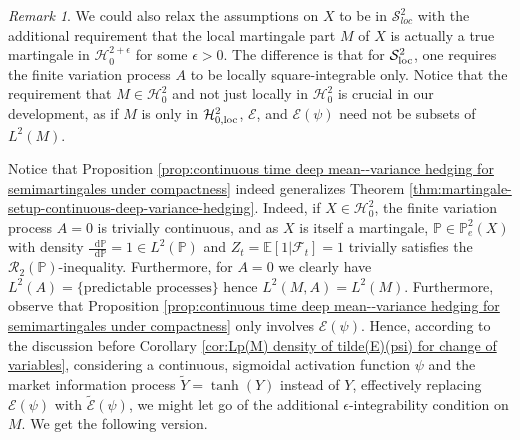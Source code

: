 \documentclass[11pt,a4paper,twoside,openany]{report}
\numberwithin{equation}{section}
\newcommand{\diff}{\mathop{}\!\mathrm{d}}
\theoremstyle{plain} %
\theoremstyle{definition} %
\theoremstyle{remark} %
\newtheorem{remark}[theorem]{Remark}
\begin{document}
\begin{remark}\label{rem:relaxed assumptions}
    We could also relax the assumptions on \(X\) to be in \(\mathcal{S}^2_{loc}\) with the additional requirement that the local martingale part \(M\) of \(X\) is actually a true martingale in \(\mathcal{H}_0^{2+\epsilon}\) for some \(\epsilon>0\). The difference is that for \(\mathcal{S}_{\rm{loc}}^2\), one requires the finite variation process \(A\) to be locally square-integrable only. Notice that the requirement that \(M\in\mathcal{H}^2_0\) and not just locally in \(\mathcal{H}^2_0\) is crucial in our development, as if \(M\) is only in  \(\mathcal{H}^2_{0,\rm{loc}}\), \(\mathcal{E}\), and \(\mathcal{E}(\psi)\) need not be subsets of \(L^2(M)\).
\end{remark}
Notice that Proposition \ref{prop:continuous time deep mean--variance hedging for semimartingales under compactness} indeed generalizes Theorem \ref{thm:martingale-setup-continuous-deep-variance-hedging}. Indeed, if \(X\in\mathcal{H}^2_0\), the finite variation process \(A=0\) is trivially continuous, and as \(X\) is itself a martingale, \(\mathbb{P}\in \mathbb{P}_e^2(X)\) with density \(\frac{\diff \mathbb{P}}{\diff \mathbb{P}}=1\in L^2(\mathbb{P})\) and \(Z_t=\mathbb{E}[1|\mathcal{F}_t]=1\) trivially satisfies the \(\mathcal{R}_2(\mathbb{P})\)-inequality. Furthermore, for \(A=0\) we clearly have \(L^2(A)=\{\text{predictable processes}\}\) hence \(L^2(M,A)=L^2(M)\). 
 Furthermore, observe that Proposition \ref{prop:continuous time deep mean--variance hedging for semimartingales under compactness} only involves \(\mathcal{E}(\psi)\). Hence, 
according to the discussion before Corollary \ref{cor:Lp(M) density of tilde(E)(psi) for change of variables}, considering a continuous, sigmoidal activation function \(\psi\) and the market information process \(\widetilde{Y}=\tanh(Y)\) instead of \(Y\), effectively replacing \(\mathcal{E}(\psi)\) with \(\widetilde{\mathcal{E}}(\psi)\), we might let go of the additional \(\epsilon\)-integrability condition on \(M\). We get the following version. 
\end{document}
